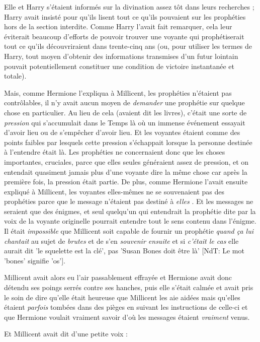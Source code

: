 Elle et Harry s'étaient informés sur la divination assez tôt dans leurs recherches ; Harry avait insisté pour qu'ils lisent tout ce qu'ils pouvaient sur les prophéties hors de la section interdite. Comme Harry l'avait fait remarquer, cela leur éviterait beaucoup d'efforts de pouvoir trouver une voyante qui prophétiserait tout ce qu'ils découvriraient dans trente-cinq ans (ou, pour utiliser les termes de Harry, tout moyen d'obtenir des informations transmises d'un futur lointain pouvait potentiellement constituer une condition de victoire instantanée et totale).

Mais, comme Hermione l'expliqua à Millicent, les prophéties n'étaient pas contrôlables, il n'y avait aucun moyen de \emph{demander}  une prophétie sur quelque chose en particulier. Au lieu de cela (avaient dit les livres), c'était une sorte de \emph{pression } qui s'accumulait dans le Temps là où un immense événement essayait d'avoir lieu ou de s'empêcher d'avoir lieu. Et les voyantes étaient comme des points faibles par lesquels cette pression s'échappait lorsque la personne destinée à l'entendre était là. Les prophéties ne concernaient donc que les choses importantes, cruciales, parce que elles seules généraient assez de pression, et on entendait quasiment jamais plus d'une voyante dire la même chose car après la première fois, la pression était partie. De plus, comme Hermione l'avait ensuite expliqué à Millicent, les voyantes elles-mêmes ne se souvenaient pas des prophéties parce que le message n'étaient pas destiné à \emph{elles} . Et les messages ne seraient que des énigmes, et seul quelqu'un qui entendrait la prophétie dite par la voix de la voyante originelle pourrait entendre tout le sens contenu dans l'énigme. Il était \emph{impossible}  que Millicent soit capable de fournir un prophétie \emph{quand ça lui chantait}  au sujet de \emph{brutes}  et de s'en \emph{souvenir ensuite}  et si \emph{c'était le cas}  elle aurait dit 'le squelette est la clé', pas 'Susan Bones doit être là' [NdT: Le mot 'bones' signifie 'os'].

Millicent avait alors eu l'air passablement effrayée et Hermione avait donc détendu ses poings serrés contre ses hanches, puis elle s'était calmée et avait pris le soin de dire qu'elle était heureuse que Millicent les aie aidées mais qu'elles étaient \emph{parfois } tombées dans des pièges en suivant les instructions de celle-ci et que Hermione voulait vraiment savoir d'où les messages étaient \emph{vraiment}  venus.

Et Millicent avait dit d'une petite voix :

